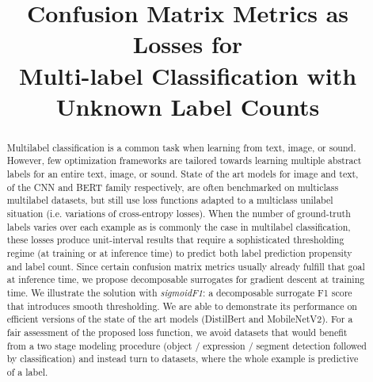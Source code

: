 \documentclass[sigconf,natbib,screen=true,review=true,anonymous]{acmart}
\begin{document}
\title[Confusion Matrix Metrics as Losses for Multi-label Classification]{Confusion Matrix Metrics as Losses for \\ Multi-label Classification with Unknown Label Counts}


\begin{abstract}
  
  Multilabel classification is a common task when learning from text, image, or sound. However, few optimization frameworks are tailored towards learning multiple abstract labels for an entire text, image, or sound. State of the art models for image and text, of the CNN and BERT family respectively, are often benchmarked on multiclass multilabel datasets, but still use loss functions adapted to a multiclass unilabel situation (i.e. variations of cross-entropy losses). When the number of ground-truth labels varies over each example as is commonly the case in multilabel classification, these losses produce unit-interval results that require a sophisticated thresholding regime (at training or at inference time) to predict both label prediction propensity and label count. Since certain confusion matrix metrics usually already fulfill that goal at inference time, we propose decomposable surrogates for gradient descent at training time. We illustrate the solution with \emph{sigmoidF1}: a decomposable surrogate F1 score that introduces smooth thresholding. We are able to demonstrate its performance on efficient versions of the state of the art models (DistilBert and MobileNetV2). For a fair assessment of the proposed loss function, we avoid datasets that would benefit from a two stage modeling procedure (object / expression / segment detection followed by classification) and instead turn to datasets, where the whole example is predictive of a label. 
\fi
\end{abstract}
\end{document}
